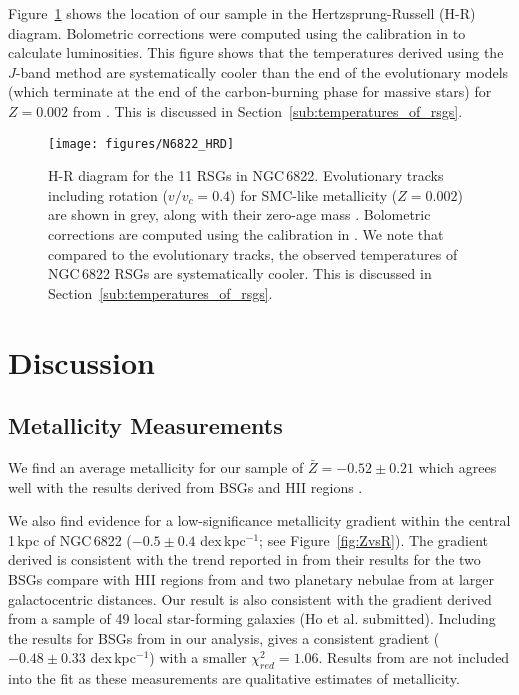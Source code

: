 \documentclass[iop]{emulateapj}
\begin{document}
Figure~\ref{fig:6822HRD} shows the location of our sample in the Hertzsprung-Russell (H-R) diagram.
Bolometric corrections were computed using the calibration in
\cite{2013ApJ...767....3D} to calculate luminosities.
This figure shows that the temperatures derived using the $J$-band method are systematically cooler than the end of the evolutionary models (which terminate at the end of the carbon-burning phase for massive stars) for
$Z=0.002$ from
\cite{2013A&A...558A.103G}.
This is discussed in Section~\ref{sub:temperatures_of_rsgs}.


\begin{figure}
\texttt{[image: figures/N6822\_HRD]}
\caption{
H-R diagram for the 11 RSGs in NGC\,6822.
Evolutionary tracks including rotation
($v/v_{c} = 0.4$) for SMC-like metallicity ($Z=0.002$)
are shown in grey, along with their zero-age mass
\protect\citep{2013A&A...558A.103G}.
Bolometric corrections are computed using the calibration in
\protect\cite{2013ApJ...767....3D}.
We note that compared to the evolutionary tracks,
the observed temperatures of NGC\,6822 RSGs are systematically cooler.
This is discussed in Section~\ref{sub:temperatures_of_rsgs}.
}
\label{fig:6822HRD}
\end{figure}



\section{Discussion} %
\label{sec:discussion}

\subsection{Metallicity Measurements} %
\label{sub:metallicity_measurements}

We find an average metallicity for our sample of $\bar{Z}=-0.52\pm 0.21$
which agrees well with the results derived from BSGs
\citep{1999A&A...352L..40M,2001ApJ...547..765V,Przybilla02} and HII regions
\citep{2006ApJ...642..813L}.

We also find evidence for a low-significance metallicity gradient within the central 1\,kpc of NGC\,6822
($-0.5\pm0.4$ dex\,kpc$^{-1}$; see Figure~\ref{fig:ZvsR}).
The gradient derived is consistent with the trend reported in
\cite{2001ApJ...547..765V}
from their results for the two BSGs compare with HII regions from
\cite{1980MNRAS.193..219P} and two planetary nebulae from
\cite{1995ApJ...445..642R} at larger galactocentric distances.
Our result is also consistent with the gradient derived from a sample of 49 local star-forming galaxies
(Ho et al. submitted).
Including the results for BSGs from
\cite{2001ApJ...547..765V}
in our analysis,
gives a consistent gradient
($-0.48\pm 0.33$ dex\,kpc$^{-1}$)
with a smaller
$\chi^{2}_{red}=1.06$.
Results from
\cite{1999A&A...352L..40M} are not included into the fit as these measurements are qualitative estimates of metallicity.
\end{document}

